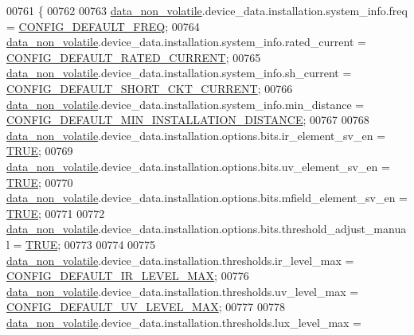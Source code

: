 \begin{DoxyCode}
00761 \{
00762 
00763         \hyperlink{a00060_a76ac5f917f5308dcd83de0d7c94559fb}{data\_non\_volatile}.device\_data.installation.system\_info.freq                     = 
      \hyperlink{a00021_a985a153b3edd3d7d638137ae0b9e5e67}{CONFIG\_DEFAULT\_FREQ};
00764         \hyperlink{a00060_a76ac5f917f5308dcd83de0d7c94559fb}{data\_non\_volatile}.device\_data.installation.system\_info.rated\_current            = 
      \hyperlink{a00021_ae329eb408f386777cbb443c27ca7c1c5}{CONFIG\_DEFAULT\_RATED\_CURRENT};
00765         \hyperlink{a00060_a76ac5f917f5308dcd83de0d7c94559fb}{data\_non\_volatile}.device\_data.installation.system\_info.sh\_current               = 
      \hyperlink{a00021_a9b142f2e7d26511af74c411c0e524384}{CONFIG\_DEFAULT\_SHORT\_CKT\_CURRENT};
00766         \hyperlink{a00060_a76ac5f917f5308dcd83de0d7c94559fb}{data\_non\_volatile}.device\_data.installation.system\_info.min\_distance             = 
      \hyperlink{a00021_aad4ef21bb535ed8bbba5a4f2d0451711}{CONFIG\_DEFAULT\_MIN\_INSTALLATION\_DISTANCE};
00767 
00768         \hyperlink{a00060_a76ac5f917f5308dcd83de0d7c94559fb}{data\_non\_volatile}.device\_data.installation.options.bits.ir\_element\_sv\_en        = 
      \hyperlink{a00040_aa8cecfc5c5c054d2875c03e77b7be15d}{TRUE};
00769         \hyperlink{a00060_a76ac5f917f5308dcd83de0d7c94559fb}{data\_non\_volatile}.device\_data.installation.options.bits.uv\_element\_sv\_en        = 
      \hyperlink{a00040_aa8cecfc5c5c054d2875c03e77b7be15d}{TRUE};
00770         \hyperlink{a00060_a76ac5f917f5308dcd83de0d7c94559fb}{data\_non\_volatile}.device\_data.installation.options.bits.mfield\_element\_sv\_en    = 
      \hyperlink{a00040_aa8cecfc5c5c054d2875c03e77b7be15d}{TRUE};
00771 
00772         \hyperlink{a00060_a76ac5f917f5308dcd83de0d7c94559fb}{data\_non\_volatile}.device\_data.installation.options.bits.threshold\_adjust\_manual = 
      \hyperlink{a00040_aa8cecfc5c5c054d2875c03e77b7be15d}{TRUE};
00773 
00774 
00775         \hyperlink{a00060_a76ac5f917f5308dcd83de0d7c94559fb}{data\_non\_volatile}.device\_data.installation.thresholds.ir\_level\_max              = 
      \hyperlink{a00021_adf882de105367de21f0cbfe4490a046f}{CONFIG\_DEFAULT\_IR\_LEVEL\_MAX};
00776         \hyperlink{a00060_a76ac5f917f5308dcd83de0d7c94559fb}{data\_non\_volatile}.device\_data.installation.thresholds.uv\_level\_max              = 
      \hyperlink{a00021_a29f761c18bae89d087200e4f1891c651}{CONFIG\_DEFAULT\_UV\_LEVEL\_MAX};
00777         
00778         \hyperlink{a00060_a76ac5f917f5308dcd83de0d7c94559fb}{data\_non\_volatile}.device\_data.installation.thresholds.lux\_level\_max             = 

\end{DoxyCode}
